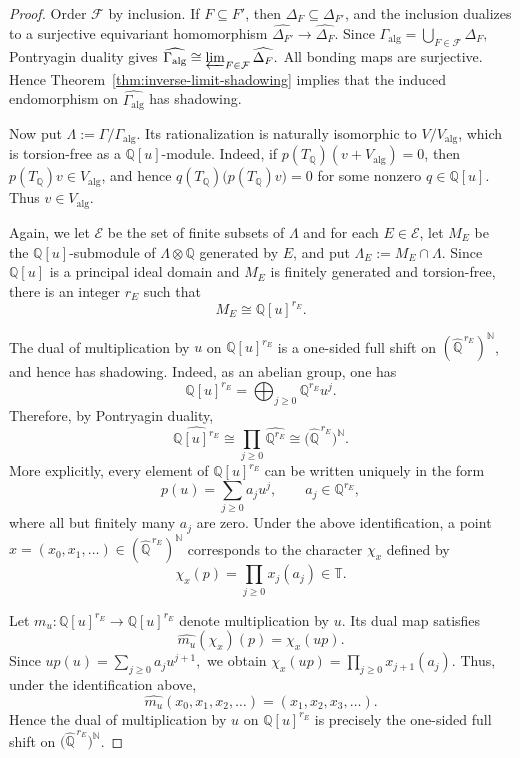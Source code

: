 \documentclass[12pt]{amsart}
\theoremstyle{definition}
\numberwithin{equation}{section}
\theoremstyle{remark}
\begin{document}
\begin{proof}
Order $\mathcal F$ by inclusion. If $F\subseteq F'$, then
$\Delta_F\subseteq\Delta_{F'}$, and the inclusion dualizes to a
surjective equivariant homomorphism
$
\widehat{\Delta_{F'}}
\longrightarrow
\widehat{\Delta_F}.
$
Since
$
\Gamma_{\mathrm{alg}}
=
\bigcup_{F\in\mathcal F}\Delta_F,
$
Pontryagin duality gives
$
\widehat{\Gamma_{\mathrm{alg}}}
\cong
\varprojlim_{F\in\mathcal F}\widehat{\Delta_F}.
$
All bonding maps are surjective. Hence
Theorem~\ref{thm:inverse-limit-shadowing} implies that the induced
endomorphism on $\widehat{\Gamma_{\mathrm{alg}}}$ has shadowing.

Now put $\Lambda:=\Gamma/\Gamma_{\mathrm{alg}}$. Its rationalization
is naturally isomorphic to $V/V_{\mathrm{alg}}$, which is torsion-free
as a $\mathbb Q[u]$-module. Indeed, if
$p(T_{\mathbb Q})(v+V_{\mathrm{alg}})=0$, then
$p(T_{\mathbb Q})v\in V_{\mathrm{alg}}$, and hence
$q(T_{\mathbb Q})\big(p(T_{\mathbb Q})v\big)=0$ for some nonzero
$q\in\mathbb Q[u]$. Thus $v\in V_{\mathrm{alg}}$.

Again, we let $\mathcal E$ be the set of finite subsets of $\Lambda$ and for each $E\in \mathcal E$, let $M_E$ be the $\mathbb Q[u]$-submodule of
$\Lambda\otimes\mathbb Q$ generated by $E$, and put
$\Lambda_E:=M_E\cap\Lambda$. Since $\mathbb Q[u]$ is a principal ideal
domain and $M_E$ is finitely generated and torsion-free, there is an
integer $r_E$ such that
\[
M_E\cong\mathbb Q[u]^{r_E}.
\]

The dual of multiplication by $u$ on $\mathbb Q[u]^{r_E}$ is a
one-sided full shift on
$(\widehat{\mathbb Q}^{\,r_E})^{\mathbb N}$, and hence has shadowing.
Indeed, as an abelian group, one has
\[
\mathbb Q[u]^{r_E}
=
\bigoplus_{j\geq 0}\mathbb Q^{r_E}u^j.
\]
Therefore, by Pontryagin duality,
\[
\widehat{\mathbb Q[u]^{r_E}}
\cong
\prod_{j\geq 0}\widehat{\mathbb Q^{r_E}}
\cong
\bigl(\widehat{\mathbb Q}^{\,r_E}\bigr)^{\mathbb N}.
\]
More explicitly, every element of $\mathbb Q[u]^{r_E}$ can be written
uniquely in the form
\[
p(u)=\sum_{j\geq 0}a_j u^j,
\qquad a_j\in\mathbb Q^{r_E},
\]
where all but finitely many $a_j$ are zero. Under the above
identification, a point
$x=(x_0,x_1,\ldots)\in
(\widehat{\mathbb Q}^{\,r_E})^{\mathbb N}$
corresponds to the character $\chi_x$ defined by
\[
\chi_x(p)
=
\prod_{j\geq 0}x_j(a_j)\in \mathbb T.
\]

Let $m_u:\mathbb Q[u]^{r_E}\to\mathbb Q[u]^{r_E}$ denote
multiplication by $u$. Its dual map satisfies
\[
\widehat{m_u}(\chi_x)(p)
=
\chi_x(up).
\]
Since
$
up(u)=\sum_{j\geq 0}a_j u^{j+1},
$
we obtain
$
\chi_x(up)
=
\prod_{j\geq 0}x_{j+1}(a_j).
$
Thus, under the identification above,
\[
\widehat{m_u}(x_0,x_1,x_2,\ldots)
=
(x_1,x_2,x_3,\ldots).
\]
Hence the dual of multiplication by $u$ on
$\mathbb Q[u]^{r_E}$ is precisely the one-sided full shift on
$\bigl(\widehat{\mathbb Q}^{\,r_E}\bigr)^{\mathbb N}$.




\end{proof}
\end{document}
